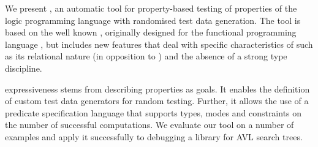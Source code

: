 

We present \plqc{}, an automatic tool for property-based
testing of properties of the logic programming language \Prolog{} with
randomised test data generation.
%
The tool is based on the well known \QuickCheck, originally designed
for the functional programming language \Haskell{}, but includes new
features that deal with specific characteristics of \Prolog{} such as
its relational nature (in opposition to \Haskell{}) and the absence
of a strong type discipline.


\plqc{} expressiveness stems from describing properties as
\Prolog{} goals.
%
It enables the definition of custom test data generators for
random testing.
%
Further, it allows the use of a predicate specification language that
supports types, modes and constraints on the number of successful
computations.
%
We evaluate our tool on a number of  examples and apply
it successfully to debugging a \Prolog{} library for AVL search trees.

